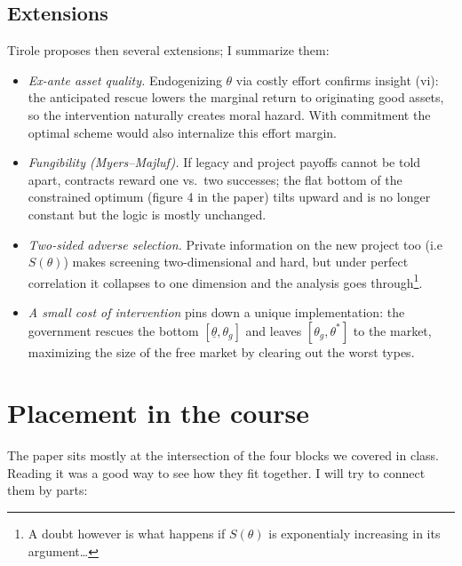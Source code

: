 \documentclass[11pt]{article}
\theoremstyle{definition}
\theoremstyle{plain}
\begin{document}
\subsection{Extensions}

Tirole proposes then several extensions; I summarize them:
\begin{itemize}[leftmargin=1.4em]
  \item \emph{Ex-ante asset quality.} Endogenizing $\theta$ via costly effort
  confirms insight (vi): the anticipated rescue lowers the marginal return to
  originating good assets, so the intervention naturally creates moral hazard. With commitment
  the optimal scheme would also internalize this effort margin.
  \item \emph{Fungibility (Myers--Majluf).} If legacy and project payoffs cannot
  be told apart, contracts reward one vs.\ two successes; the flat bottom of the
  constrained optimum (figure 4 in the paper) tilts upward and is no longer constant but the logic is mostly unchanged.
  \item \emph{Two-sided adverse selection.} Private information on the new
  project too (i.e $S(\theta)$) makes screening two-dimensional and hard, but under perfect
  correlation it collapses to one dimension and the analysis goes through\footnote{A doubt however is what happens if $S(\theta)$ is exponentialy increasing in its argument\dots}.
  \item \emph{A small cost of intervention} pins down a unique
  implementation: the government rescues the bottom $[\underline\theta,\theta_g]$
  and leaves $[\theta_g,\theta^\ast]$ to the market, maximizing the size of the
  free market by clearing out the worst types.
\end{itemize}

\section{Placement in the course}
\label{section2}

The paper sits mostly at the intersection of the four blocks we covered in class. Reading it was a good way to see how they fit together. I will try to connect them by parts:
\end{document}
